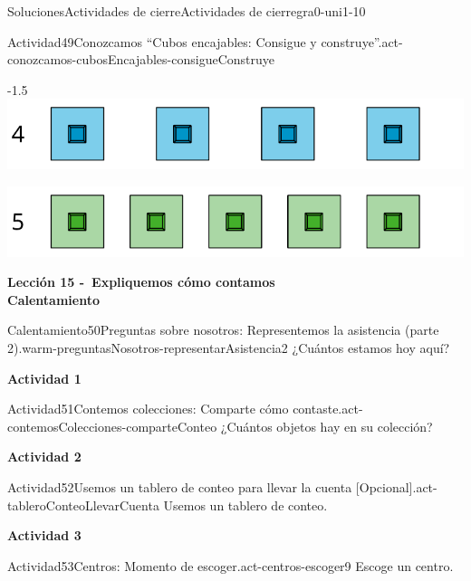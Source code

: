 \documentclass[twoside,10pt,]{article}
\begin{document}
\begin{solutions-section}{Soluciones}{Actividades de cierre}{}{Actividades de cierre}{}{}{gra0-uni1-10}
\begin{activitysolution}{Actividad}{49}{Conozcamos “Cubos encajables: Consigue y construye”.}{act-conozcamos-cubosEncajables-consigueConstruye}
\begin{image}{0}{1}{0}{-1.5\baselineskip}
\includegraphics[width=\linewidth]{external/svg-source/tikz-file-148187.pdf}
\end{image}%
\begin{image}{0}{1}{0}{}%
\includegraphics[width=\linewidth]{external/svg-source/tikz-file-148188.pdf}
\end{image}%
\end{activitysolution}%
\par\medskip
\noindent\textbf{\large{}\space\textperiodcentered\space{}Lección 15 -~Expliquemos cómo contamos\\
\space\textperiodcentered\space{}Calentamiento}
\begin{explorationsolution}{Calentamiento}{50}{Preguntas sobre nosotros: Representemos la asistencia (parte 2).}{warm-preguntasNosotros-representarAsistencia2}%
¿Cuántos estamos hoy aquí?%
\end{explorationsolution}%
\par\medskip
\noindent\textbf{\large{}\space\textperiodcentered\space{}Actividad 1}
\begin{activitysolution}{Actividad}{51}{Contemos colecciones: Comparte cómo contaste.}{act-contemosColecciones-comparteConteo}%
¿Cuántos objetos hay en su colección?%
\end{activitysolution}%
\par\medskip
\noindent\textbf{\large{}\space\textperiodcentered\space{}Actividad 2}
\begin{activitysolution}{Actividad}{52}{Usemos un tablero de conteo para llevar la cuenta [Opcional].}{act-tableroConteoLlevarCuenta}%
Usemos un tablero de conteo.%
\end{activitysolution}%
\par\medskip
\noindent\textbf{\large{}\space\textperiodcentered\space{}Actividad 3}
\begin{activitysolution}{Actividad}{53}{Centros: Momento de escoger.}{act-centros-escoger9}%
Escoge un centro.%
\begin{sidebyside}{2}{0.025}{0.025}{0.05}%
\begin{sbspanel}{0.45}%

\end{sbspanel}
\end{sidebyside}
\end{activitysolution}
\end{solutions-section}
\end{document}
